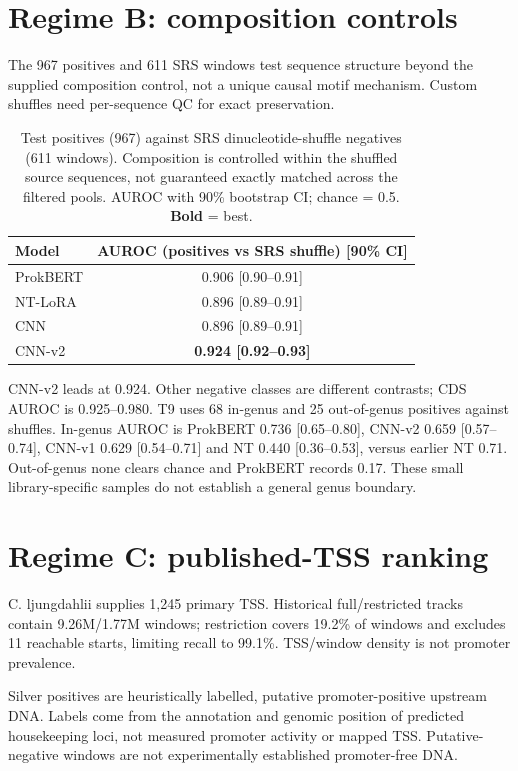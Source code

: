 \documentclass{article}
\begin{document}
\section{Regime B: composition controls}
The 967 positives and 611 SRS windows test sequence structure beyond the supplied composition control, not a unique causal motif mechanism. Custom shuffles need per-sequence QC for exact preservation.

\begin{table}[h]
\centering
\caption{Test positives (967) against SRS dinucleotide-shuffle negatives (611 windows). Composition is controlled within the shuffled source sequences, not guaranteed exactly matched across the filtered pools. AUROC with 90\% bootstrap CI; chance = 0.5. \textbf{Bold} = best.}
\begin{tabular}{lc}
\toprule
Model & AUROC (positives vs SRS shuffle) [90\% CI] \\
\midrule
ProkBERT & 0.906 [0.90--0.91] \\
NT-LoRA  & 0.896 [0.89--0.91] \\
CNN      & 0.896 [0.89--0.91] \\
CNN-v2   & \textbf{0.924 [0.92--0.93]} \\
\bottomrule
\end{tabular}
\end{table}

CNN-v2 leads at 0.924. Other negative classes are different contrasts; CDS AUROC is 0.925--0.980. T9 uses 68 in-genus and 25 out-of-genus positives against shuffles. In-genus AUROC is ProkBERT 0.736 [0.65--0.80], CNN-v2 0.659 [0.57--0.74], CNN-v1 0.629 [0.54--0.71] and NT 0.440 [0.36--0.53], versus earlier NT 0.71. Out-of-genus none clears chance and ProkBERT records 0.17. These small library-specific samples do not establish a general genus boundary.

\section{Regime C: published-TSS ranking}
C. ljungdahlii supplies 1,245 primary TSS. Historical full/restricted tracks contain 9.26M/1.77M windows; restriction covers 19.2\% of windows and excludes 11 reachable starts, limiting recall to 99.1\%. TSS/window density is not promoter prevalence.

Silver positives are heuristically labelled, putative promoter-positive upstream DNA. Labels come from the annotation and genomic position of predicted housekeeping loci, not measured promoter activity or mapped TSS. Putative-negative windows are not experimentally established promoter-free DNA.
\end{document}
